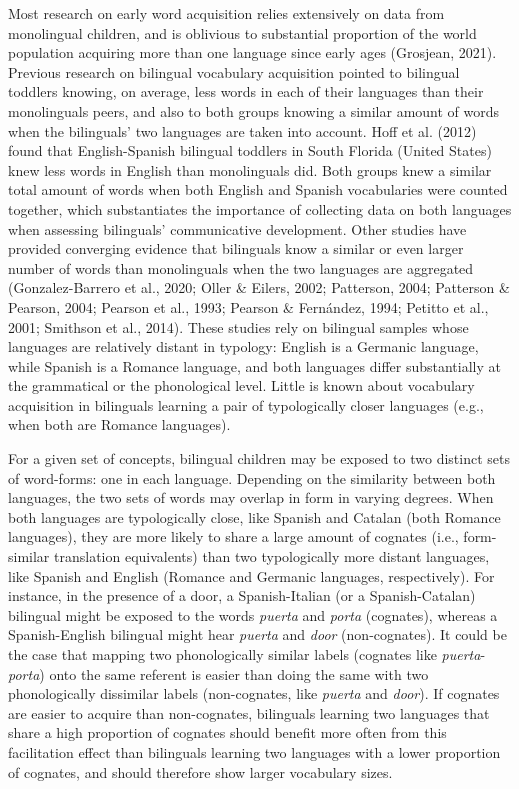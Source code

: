 \documentclass[
  man,
  floatsintext,
  colorlinks=true,linkcolor=blue,citecolor=blue,urlcolor=blue,biblatex]{apa7}
\begin{document}
Most research on early word acquisition relies extensively on data from
monolingual children, and is oblivious to substantial proportion of the
world population acquiring more than one language since early ages
(Grosjean, 2021). Previous research on bilingual vocabulary acquisition
pointed to bilingual toddlers knowing, on average, less words in each of
their languages than their monolinguals peers, and also to both groups
knowing a similar amount of words when the bilinguals' two languages are
taken into account. Hoff et al. (2012) found that English-Spanish
bilingual toddlers in South Florida (United States) knew less words in
English than monolinguals did. Both groups knew a similar total amount
of words when both English and Spanish vocabularies were counted
together, which substantiates the importance of collecting data on both
languages when assessing bilinguals' communicative development. Other
studies have provided converging evidence that bilinguals know a similar
or even larger number of words than monolinguals when the two languages
are aggregated (Gonzalez-Barrero et al., 2020; Oller \& Eilers, 2002;
Patterson, 2004; Patterson \& Pearson, 2004; Pearson et al., 1993;
Pearson \& Fernández, 1994; Petitto et al., 2001; Smithson et al.,
2014). These studies rely on bilingual samples whose languages are
relatively distant in typology: English is a Germanic language, while
Spanish is a Romance language, and both languages differ substantially
at the grammatical or the phonological level. Little is known about
vocabulary acquisition in bilinguals learning a pair of typologically
closer languages (e.g., when both are Romance languages).

For a given set of concepts, bilingual children may be exposed to two
distinct sets of word-forms: one in each language. Depending on the
similarity between both languages, the two sets of words may overlap in
form in varying degrees. When both languages are typologically close,
like Spanish and Catalan (both Romance languages), they are more likely
to share a large amount of cognates (i.e., form-similar translation
equivalents) than two typologically more distant languages, like Spanish
and English (Romance and Germanic languages, respectively). For
instance, in the presence of a door, a Spanish-Italian (or a
Spanish-Catalan) bilingual might be exposed to the words \emph{puerta}
and \emph{porta} (cognates), whereas a Spanish-English bilingual might
hear \emph{puerta} and \emph{door} (non-cognates). It could be the case
that mapping two phonologically similar labels (cognates like
\emph{puerta}-\emph{porta}) onto the same referent is easier than doing
the same with two phonologically dissimilar labels (non-cognates, like
\emph{puerta} and \emph{door}). If cognates are easier to acquire than
non-cognates, bilinguals learning two languages that share a high
proportion of cognates should benefit more often from this facilitation
effect than bilinguals learning two languages with a lower proportion of
cognates, and should therefore show larger vocabulary sizes.
\end{document}
